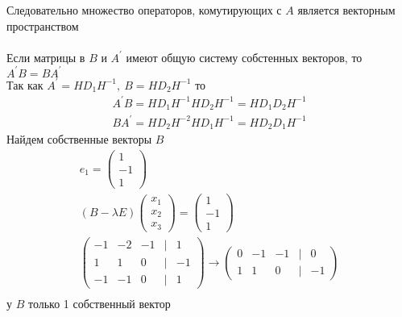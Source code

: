 		Следовательно множество операторов, комутирующих с $A$ является векторным пространством\\
		\\
		Если матрицы в $B$ и $A^{\prime}$ имеют общую систему собстенных векторов, то $A^{\prime}B = B A^{\prime}$\\
		Так как $A^{\prime} = H D_1 H^{-1},\ B = H D_2 H^{-1}$ то 
		\begin{gather*}
			A^{\prime}B = HD_1H^{-1} HD_2H^{-1} = HD_1D_2H^{-1}\\
			BA^{\prime} = HD_2H^{-2} HD_1H^{-1} = HD_2D_1H^{-1}
		\end{gather*}
		Найдем собственные векторы $B$
		\begin{gather*}
			e_1 =
			\begin{pmatrix}
				1 \\ -1 \\ 1
			\end{pmatrix}\\
			(B - \lambda E)
			\begin{pmatrix}
				x_1 \\ x_2 \\ x_3
			\end{pmatrix}
			=
			\begin{pmatrix}
				1 \\ -1 \\ 1
			\end{pmatrix}
			\\
			\begin{pmatrix}
			-1 & -2 & -1 & | & 1\\
			1 & 1 & 0 & | & -1\\
			-1 & -1 & 0 & | & 1
			\end{pmatrix}
			\to
			\begin{pmatrix}
			0 & -1 & -1 & | & 0\\
			1 & 1 & 0 & | & -1
			\end{pmatrix}
			\\
		\end{gather*}
		 у $B$ только 1 собственный вектор
		
